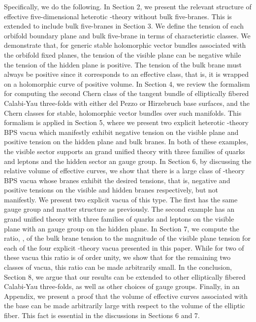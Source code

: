 \documentclass[a4paper,12pt]{article}
\numberwithin{equation}{section}
\theoremstyle{plain}
\begin{document}
Specifically, we do the following. In Section 2, we present the relevant
structure of effective five-dimensional heterotic \coordHE{}-theory without bulk
five-branes. This is extended to include bulk five-branes in Section 3. We
define the tension of each orbifold boundary plane and bulk
five-brane in terms of characteristic classes. We demonstrate that, for
generic stable holomorphic vector bundles associated 
with the orbifold fixed planes,
the tension of the visible plane can be negative while the tension of the
hidden plane is positive. The tension of the bulk brane must always be
positive since it corresponds to an effective class, that is, it is wrapped on
a holomorphic curve of positive volume. In Section 4, we review
the formalism for computing the second Chern class of the tangent
bundle of elliptically fibered Calabi-Yau three-folds with either 
del Pezzo or Hirzebruch base surfaces, and the Chern classes for stable,
holomorphic vector bundles over such manifolds. This formalism is applied in
Section 5, where we present two explicit heterotic \coordHE{}-theory BPS vacua
which manifestly exhibit negative tension on the visible plane and 
positive tension on the hidden plane  and bulk branes. In both of these examples,
the visible sector supports an \coordHE{} grand unified theory with three families
of quarks and leptons and the hidden sector an \coordHE{} gauge group. In
Section 6, by discussing the relative volume of effective curves, we show that
there is a large class of \coordHE{}-theory BPS vacua whose branes exhibit the desired 
tensions, that is, negative and positive tensions on the visible and
hidden branes respectively, but not manifestly.
We present two explicit vacua of this type. The first has the same gauge
group and matter structure as previously. The second example has
an \coordHE{} grand unified theory with three families of quarks and leptons 
on the visible plane with an \coordHE{} gauge group on the hidden plane. In Section 7, 
we compute the ratio, \myHighlight{$\beta/|\alpha|$}\coordHE{}, of the bulk
brane tension to the magnitude of the visible plane tension for each of the
four explicit \coordHE{}-theory vacua presented in this paper. While for two of 
these vacua this ratio is of order unity, we show that for the remaining two 
classes of vacua, this ratio can be made arbitrarily small.
In the conclusion, Section 8, we argue that our results can be extended to 
other elliptically fibered
Calabi-Yau three-folds, as well as other choices of gauge groups.
Finally, in an Appendix, we present a proof that the
volume of effective curves associated with the base can be made arbitrarily
large with respect to the volume of the elliptic fiber. This fact is essential
in the discussions in Sections 6 and 7. 
\end{document}
